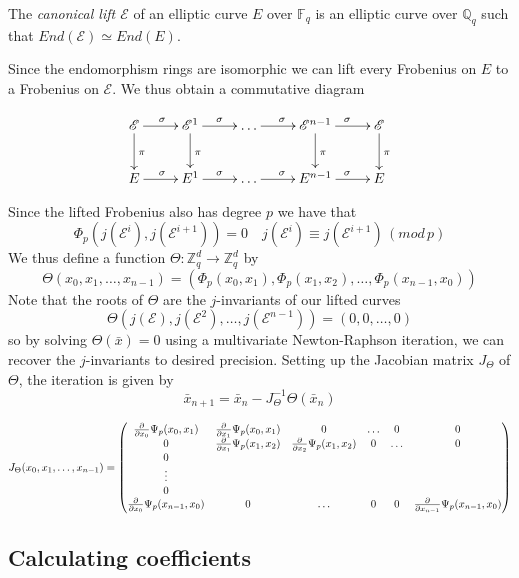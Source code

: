 \documentclass[a4paper,10pt]{amsart}
\begin{document}
\begin{mydef}
 The \emph{canonical lift $\mathscr{E}$} of an elliptic curve $E$ over $\mathbb{F}_q$ is
an elliptic curve over $\mathbb{Q}_q$ such that $End(\mathscr{E}) \simeq End(E)$.
\end{mydef}

Since the endomorphism rings are isomorphic we can lift every Frobenius on $E$ to a
Frobenius on $\mathscr{E}$. We thus obtain a commutative diagram

$$
\xymatrix {
  \mathscr{E} \ar[d]^\pi \ar[r]^\sigma & \mathscr{E}^1 \ar[d]^\pi \ar[r]^\sigma & \ldots \ar[r]^\sigma & \mathscr{E}^{n-1} \ar[d]^\pi \ar[r]^\sigma & \mathscr{E} \ar[d]^\pi \\
  E \ar[r]^\sigma & E^1 \ar[r]^\sigma &\ldots \ar[r]^\sigma & E^{n-1} \ar[r]^\sigma & E \\
}
$$

Since the lifted Frobenius also has degree $p$ we have that
$$\Phi_p(j(\mathscr{E}^i), j(\mathscr{E}^{i+1})) = 0 \quad j(\mathscr{E}^i) \equiv j(\mathscr{E}^{i+1}) \, (mod\, p) $$
We thus define a function $\Theta: \mathbb{Z}_q^d \rightarrow \mathbb{Z}_q^d$ by
$$\Theta(x_0, x_1, \ldots, x_{n-1}) = (\Phi_p(x_0, x_1), \Phi_p(x_1, x_2), \ldots, \Phi_p(x_{n-1}, x_0))$$
Note that the roots of $\Theta$ are the $j$-invariants of our lifted curves
$$\Theta(j(\mathscr{E}), j(\mathscr{E}^2), \ldots, j(\mathscr{E}^{n-1})) = (0, 0, \ldots, 0) $$
so by solving $\Theta(\bar{x}) = 0$ using a multivariate Newton-Raphson iteration, we can
recover the $j$-invariants to desired precision. Setting up the Jacobian matrix $J_\Theta$
of $\Theta$, the iteration is given by
$$ \bar{x}_{n+1} = \bar{x}_n - J_\Theta^{-1} \Theta(\bar{x}_n) $$


$$
J_\Theta(x_0, x_1, \ldots, x_{n-1}) = 
\begin{pmatrix}
  {\partial \over \partial x_0} \Psi_p(x_0, x_1) & {\partial \over \partial x_1} \Psi_p(x_0, x_1) & 0 & \ldots & 0 & 0 \\
  0 & {\partial \over \partial x_1} \Psi_p(x_1, x_2) & {\partial \over \partial x_2} \Psi_p(x_1, x_2) & 0 & \ldots & 0 \\
  0 \\
  \vdots \\
  0 \\
  {\partial \over \partial x_0} \Psi_p(x_{n-1}, x_0) & 0 & \ldots & 0 & 0 & {\partial \over \partial x_{n-1}} \Psi_p(x_{n-1}, x_0) \\
\end{pmatrix}
$$

\subsection{Calculating coefficients}
\end{document}
